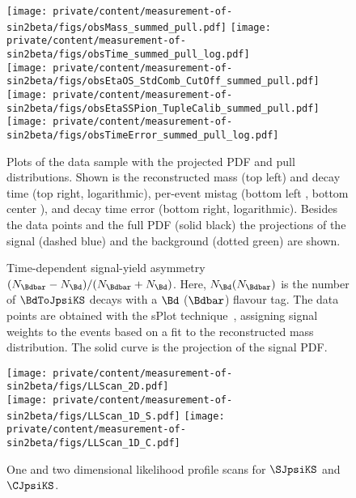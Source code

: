 \begin{figure}
\centering
  \texttt{[image: private/content/measurement-of-sin2beta/figs/obsMass\_summed\_pull.pdf]} 
  \texttt{[image: private/content/measurement-of-sin2beta/figs/obsTime\_summed\_pull\_log.pdf]} \\
  \texttt{[image: private/content/measurement-of-sin2beta/figs/obsEtaOS\_StdComb\_CutOff\_summed\_pull.pdf]}
  \texttt{[image: private/content/measurement-of-sin2beta/figs/obsEtaSSPion\_TupleCalib\_summed\_pull.pdf]}
  \texttt{[image: private/content/measurement-of-sin2beta/figs/obsTimeError\_summed\_pull\_log.pdf]}
  \caption{Plots of the \BdToJpsiKS data sample with the projected \ac{PDF} and
  pull distributions. Shown is the reconstructed mass \obsMass (top left) and
  decay time \obsTime (top right, logarithmic), per-event mistag (bottom left
  \obsEtaOS, bottom center \obsEtaSS), and decay time error \obsTimeError (bottom
  right, logarithmic). Besides the data points and the full
  \ac{PDF} (solid black) the projections of the signal (dashed blue) and the
  background (dotted green) are shown.}
  \label{fig:measurement_of_sin2beta:cpv_measurement:results:plots:dimensions}
\end{figure}
%
\begin{figure}
\centering
  \begin{tikzpicture}[scale=0.7]
  
  \end{tikzpicture}
  \caption{
    Time-dependent signal-yield asymmetry $(N_{\Bdbar} - N_{\Bd})/(N_{\Bdbar} +
    N_{\Bd})$. Here, $N_{\Bd} (N_{\Bdbar})$ is the number of $\BdToJpsiKS$ decays with
    a $\Bd$ ($\Bdbar$) flavour tag. The data points are obtained with the sPlot
    technique~\cite{Pivk:2004ty}, assigning signal weights to the events based on a
    fit to the reconstructed mass distribution. The solid curve is the projection of
    the signal PDF.}
  \label{fig:measurement_of_sin2beta:cpv_measurement:results:plots:asymmetry}
\end{figure}
%
\begin{figure}
  \centering
  \texttt{[image: private/content/measurement-of-sin2beta/figs/LLScan\_2D.pdf]} \\
  \texttt{[image: private/content/measurement-of-sin2beta/figs/LLScan\_1D\_S.pdf]}
  \texttt{[image: private/content/measurement-of-sin2beta/figs/LLScan\_1D\_C.pdf]}
  \caption{One and two dimensional likelihood profile scans for $\SJpsiKS$ and $\CJpsiKS$.}
  \label{fig:measurement_of_sin2beta:cpv_measurement:results:plots:ll_scan}
\end{figure}
